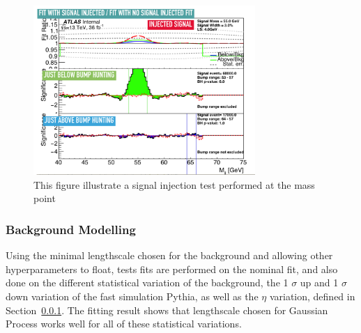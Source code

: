 \begin{figure}[!htb]
    \begin{center}
        \includegraphics[width=0.75\textwidth]{figures/chapter_dimuon/signalInjection}        
        \caption{
        This figure illustrate a signal injection test performed at the mass point  }
            \label{fig:dimuonstudies}
    \end{center}
\end{figure}

\subsubsection{Background Modelling}
Using the minimal lengthscale chosen for the background and allowing other hyperparameters to float, tests fits are performed on the nominal fit, and also done on the different statistical variation of the background, the 1 $\sigma$ up and 1 $\sigma$ down variation of the fast simulation Pythia, as well as the $\eta$ variation, defined in Section~\ref{}.
The fitting result shows that lengthscale chosen for Gaussian Process works well for all of these statistical variations. 

